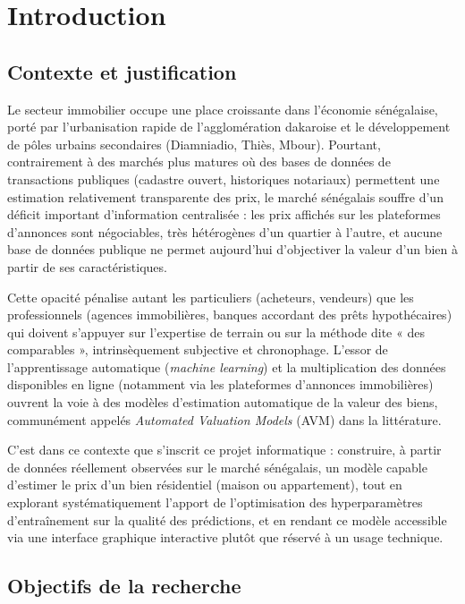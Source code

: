 \chapter{Introduction}

\section{Contexte et justification}

Le secteur immobilier occupe une place croissante dans l'économie sénégalaise, porté par
l'urbanisation rapide de l'agglomération dakaroise et le développement de pôles urbains
secondaires (Diamniadio, Thiès, Mbour). Pourtant, contrairement à des marchés plus matures où
des bases de données de transactions publiques (cadastre ouvert, historiques notariaux)
permettent une estimation relativement transparente des prix, le marché sénégalais souffre
d'un déficit important d'information centralisée : les prix affichés sur les plateformes
d'annonces sont négociables, très hétérogènes d'un quartier à l'autre, et aucune base de
données publique ne permet aujourd'hui d'objectiver la valeur d'un bien à partir de ses
caractéristiques.

Cette opacité pénalise autant les particuliers (acheteurs, vendeurs) que les professionnels
(agences immobilières, banques accordant des prêts hypothécaires) qui doivent s'appuyer sur
l'expertise de terrain ou sur la méthode dite « des comparables », intrinsèquement subjective
et chronophage. L'essor de l'apprentissage automatique (\emph{machine learning}) et la
multiplication des données disponibles en ligne (notamment via les plateformes d'annonces
immobilières) ouvrent la voie à des modèles d'estimation automatique de la valeur des biens,
communément appelés \emph{Automated Valuation Models} (AVM) dans la littérature.

C'est dans ce contexte que s'inscrit ce projet informatique : construire, à partir de données
réellement observées sur le marché sénégalais, un modèle capable d'estimer le prix d'un bien
résidentiel (maison ou appartement), tout en explorant systématiquement l'apport de
l'optimisation des hyperparamètres d'entraînement sur la qualité des prédictions, et en rendant
ce modèle accessible via une interface graphique interactive plutôt que réservé à un usage
technique.

\section{Objectifs de la recherche}

